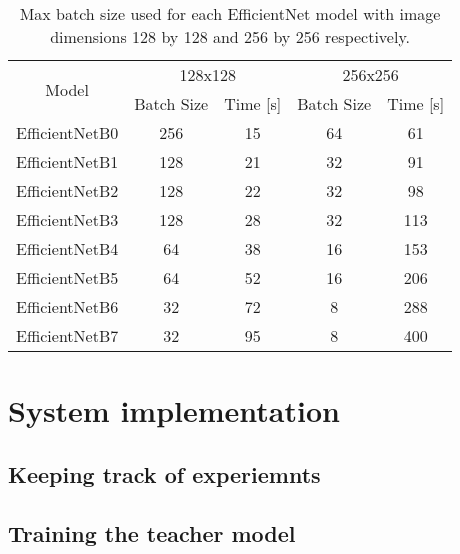 \documentclass[thesis.tex]{subfiles}
\begin{document}
\begin{table} %
  \centering
  \begin{tabular}{|c|cc|cc|}
	\hline
	\multirow{2}{*}{Model} & \multicolumn{2}{c|}{128x128} & \multicolumn{2}{c|}{256x256} \\
	\cline{2-5}
	& Batch Size & Time [s] & Batch Size & Time [s] \\
	\hline
	EfficientNetB0 & 256 & 15 	& 64  & 61  \\
	EfficientNetB1 & 128 & 21	& 32  & 91  \\
	EfficientNetB2 & 128 & 22	& 32  & 98  \\
 	EfficientNetB3 & 128 & 28	& 32  & 113 \\
  	EfficientNetB4 & 64  & 38	& 16  & 153 \\
  	EfficientNetB5 & 64  & 52	& 16  & 206 \\
  	EfficientNetB6 & 32  & 72	& 8   & 288 \\
  	EfficientNetB7 & 32  & 95	& 8   & 400 \\
  	\hline
  \end{tabular}
  \caption[Max batch size for each EfficientNet model]{Max batch size used for each EfficientNet model with image dimensions 128 by 128 and 256 by 256 respectively.}
  \label{table:model_bs}
\end{table}



\section{System implementation} \label{sec:system_implementation}



\subsection{Keeping track of experiemnts}




\subsection{Training the teacher model}
\end{document}
